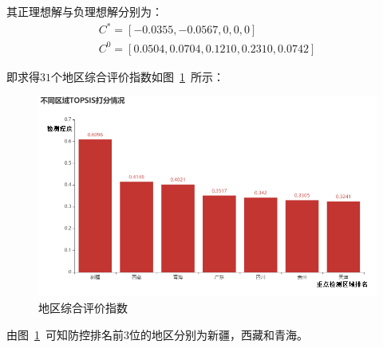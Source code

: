 \documentclass{whutmod}
\begin{document}
    其正理想解与负理想解分别为：
    \begin{gather}
    C^{*}=[-0.0355,-0.0567,0,0,0]\\
    C^{0}=[0.0504,0.0704,0.1210,0.2310,0.0742]
    \end{gather}
    
    即求得$31$个地区综合评价指数如图~\ref{area}~所示：
    \begin{figure}[H]
    	\centering
    	\includegraphics[width=.9\textwidth]{figures/area.png}
    	\caption{地区综合评价指数}\label{area}
    \end{figure}
    由图~\ref{area}~可知防控排名前$3$位的地区分别为新疆，西藏和青海。
    
\end{document}
